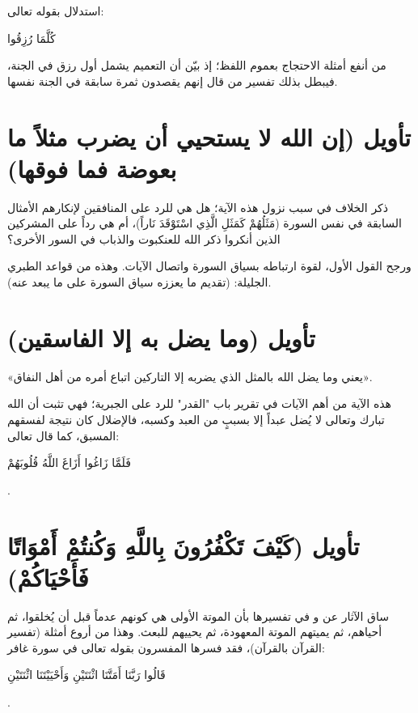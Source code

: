 \begin{fawaid}
استدلال  بقوله تعالى: \begin{ayah}كُلَّمَا رُزِقُوا\end{ayah} من أنفع أمثلة الاحتجاج بعموم اللفظ؛ إذ بيّن أن التعميم يشمل أول رزق في الجنة، فيبطل بذلك تفسير من قال إنهم يقصدون ثمرة سابقة في الجنة نفسها.
\end{fawaid}

\separator

\section{تأويل (إن الله لا يستحيي أن يضرب مثلاً ما بعوضة فما فوقها)}
ذكر  الخلاف في سبب نزول هذه الآية؛ هل هي للرد على المنافقين لإنكارهم الأمثال السابقة في نفس السورة (مَثَلُهُمْ كَمَثَلِ الَّذِي اسْتَوْقَدَ نَاراً)، أم هي رداً على المشركين الذين أنكروا ذكر الله للعنكبوت والذباب في السور الأخرى؟

ورجح  القول الأول، لقوة ارتباطه بسياق السورة واتصال الآيات. وهذه من قواعد الطبري الجليلة: (تقديم ما يعززه سياق السورة على ما يبعد عنه).

\separator

\section{تأويل (وما يضل به إلا الفاسقين)}
 «يعني وما يضل الله بالمثل الذي يضربه إلا التاركين اتباع أمره من أهل النفاق».

\begin{fawaid}
هذه الآية من أهم الآيات في تقرير باب "القدر" للرد على الجبرية؛ فهي تثبت أن الله تبارك وتعالى لا يُضل عبداً إلا بسببٍ من العبد وكسبه، فالإضلال كان نتيجة لفسقهم المسبق، كما قال تعالى: \begin{ayah}فَلَمَّا زَاغُوا أَزَاغَ اللَّهُ قُلُوبَهُمْ\end{ayah}.
\end{fawaid}

\separator

\section{تأويل (كَيْفَ تَكْفُرُونَ بِاللَّهِ وَكُنتُمْ أَمْوَاتًا فَأَحْيَاكُمْ)}
ساق  الآثار عن  و في تفسيرها بأن الموتة الأولى هي كونهم عدماً قبل أن يُخلقوا، ثم أحياهم، ثم يميتهم الموتة المعهودة، ثم يحييهم للبعث.
وهذا من أروع أمثلة (تفسير القرآن بالقرآن)، فقد فسرها المفسرون بقوله تعالى في سورة غافر: \begin{ayah}قَالُوا رَبَّنَا أَمَتَّنَا اثْنَتَيْنِ وَأَحْيَيْتَنَا اثْنَتَيْنِ\end{ayah}.

